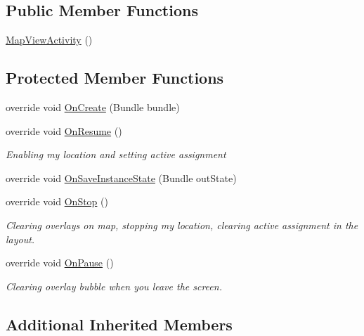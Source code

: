\subsection*{Public Member Functions}
\begin{DoxyCompactItemize}
\item 
\hyperlink{class_field_service_1_1_android_1_1_map_view_activity_a528cc367f11234a4ab7ce3d73ecb7a7d}{Map\+View\+Activity} ()
\end{DoxyCompactItemize}
\subsection*{Protected Member Functions}
\begin{DoxyCompactItemize}
\item 
override void \hyperlink{class_field_service_1_1_android_1_1_map_view_activity_aa75bbaa3f02c15b231fa1cb5157c9731}{On\+Create} (Bundle bundle)
\item 
override void \hyperlink{class_field_service_1_1_android_1_1_map_view_activity_afa7501050e6a0e2e664d06d028d8972e}{On\+Resume} ()
\begin{DoxyCompactList}\small\item\em Enabling my location and setting active assignment \end{DoxyCompactList}\item 
override void \hyperlink{class_field_service_1_1_android_1_1_map_view_activity_a471e56430a93c5a8f4d6b8a1cdd77104}{On\+Save\+Instance\+State} (Bundle out\+State)
\item 
override void \hyperlink{class_field_service_1_1_android_1_1_map_view_activity_a98852729ad25a09691cdf267a25ea880}{On\+Stop} ()
\begin{DoxyCompactList}\small\item\em Clearing overlays on map, stopping my location, clearing active assignment in the layout. \end{DoxyCompactList}\item 
override void \hyperlink{class_field_service_1_1_android_1_1_map_view_activity_a79a7aab439adec60b0bbc014d2beb1ad}{On\+Pause} ()
\begin{DoxyCompactList}\small\item\em Clearing overlay bubble when you leave the screen. \end{DoxyCompactList}\end{DoxyCompactItemize}
\subsection*{Additional Inherited Members}


